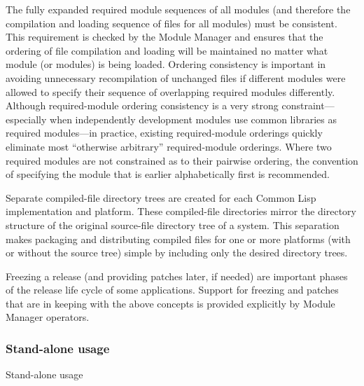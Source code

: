 \documentclass[10pt,twoside,english,pdftex]{article}
\begin{document}
\begin{tightitemize}
%
\item The fully expanded required module sequences of all modules (and
  therefore the compilation and loading sequence of files for all modules)
  must be consistent.  This requirement is checked by the Module Manager and
  ensures that the ordering of file compilation and loading will be maintained
  no matter what module (or modules) is being loaded.  Ordering consistency is
  important in avoiding unnecessary recompilation of unchanged files if
  different modules were allowed to specify their sequence of overlapping
  required modules differently.  Although required-module ordering consistency
  is a very strong constraint---especially when independently development
  modules use common libraries as required modules---in practice, existing
  required-module orderings quickly eliminate most ``otherwise arbitrary''
  required-module orderings.  Where two required modules are not constrained
  as to their pairwise ordering, the convention of specifying the module that
  is earlier alphabetically first is recommended.
%
\item Separate compiled-file directory trees are created for each Common Lisp
  implementation and platform.  These compiled-file directories mirror the
  directory structure of the original source-file directory tree of a system.
  This separation makes packaging and distributing compiled files for one or
  more platforms (with or without the source tree) simple by including only
  the desired directory trees.
%
\item Freezing a release (and providing patches later, if needed) are
  important phases of the release life cycle of some applications.  Support
  for freezing and patches that are in keeping with the above concepts is
  provided explicitly by Module Manager operators.
\end{tightitemize}

\T\subsubsection*{Stand-alone usage}
\W{}Stand-alone usage
\end{document}
